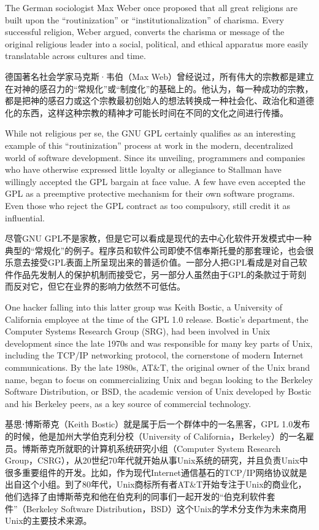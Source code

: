 \ifdefined\eng
The German sociologist Max Weber once proposed that all great religions are built upon the ``routinization'' or ``institutionalization'' of charisma. Every successful religion, Weber argued, converts the charisma or message of the original religious leader into a social, political, and ethical apparatus more easily translatable across cultures and time.
\fi

\ifdefined\chs
德国著名社会学家马克斯·韦伯（Max Web）曾经说过，所有伟大的宗教都是建立在对神的感召力的``常规化''或``制度化''的基础上的。他认为，每一种成功的宗教，都是把神的感召力或这个宗教最初创始人的想法转换成一种社会化、政治化和道德化的东西，这样这种宗教的精神才可能长时间在不同的文化之间进行传播。
\fi

\ifdefined\eng
While not religious per se, the GNU GPL certainly qualifies as an interesting example of this ``routinization'' process at work in the modern, decentralized world of software development. Since its unveiling, programmers and companies who have otherwise expressed little loyalty or allegiance to Stallman have willingly accepted the GPL bargain at face value. A few have even accepted the GPL as a preemptive protective mechanism for their own software programs. Even those who reject the GPL contract as too compulsory, still credit it as influential.
\fi

\ifdefined\chs
尽管GNU GPL不是家教，但是它可以看成是现代的去中心化软件开发模式中一种典型的``常规化''的例子。程序员和软件公司即使不信奉斯托曼的那套理论，也会很乐意去接受GPL表面上所呈现出来的普适价值。一部分人把GPL看成是对自己软件作品先发制人的保护机制而接受它，另一部分人虽然由于GPL的条款过于苛刻而反对它，但它在业界的影响力依然不可低估。
\fi

\ifdefined\eng
One hacker falling into this latter group was Keith Bostic, a University of California employee at the time of the GPL 1.0 release. Bostic's department, the Computer Systems Research Group (SRG), had been involved in Unix development since the late 1970s and was responsible for many key parts of Unix, including the TCP/IP networking protocol, the cornerstone of modern Internet communications. By the late 1980s, AT\&T, the original owner of the Unix brand name, began to focus on commercializing Unix and began looking to the Berkeley Software Distribution, or BSD, the academic version of Unix developed by Bostic and his Berkeley peers, as a key source of commercial technology.
\fi

\ifdefined\chs
基思⋅博斯蒂克（Keith Bostic）就是属于后一个群体中的一名黑客，GPL 1.0发布的时候，他是加州大学伯克利分校（University of California，Berkeley）的一名雇员。博斯蒂克所就职的计算机系统研究小组（Computer System Research Group，CSRG），从20世纪70年代就开始从事Unix系统的研究，并且负责Unix中很多重要组件的开发。比如，作为现代Internet通信基石的TCP/IP网络协议就是出自这个小组。到了80年代，Unix商标所有者AT\&T开始专注于Unix的商业化，他们选择了由博斯蒂克和他在伯克利的同事们一起开发的``伯克利软件套件''（Berkeley Software Distribution，BSD）这个Unix的学术分支作为未来商用Unix的主要技术来源。
\fi


